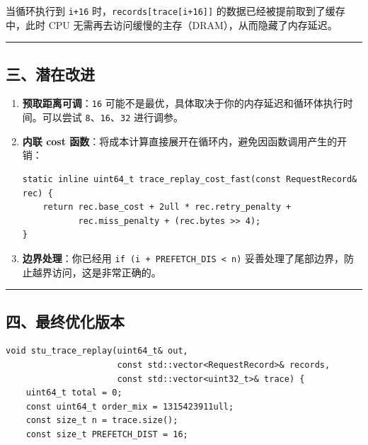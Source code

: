 \documentclass[11pt, a4paper]{article}
\begin{document}
\begin{aibox}
当循环执行到 \texttt{i+16} 时，\texttt{records[trace[i+16]]} 的数据已经被提前取到了缓存中，此时 CPU 无需再去访问缓慢的主存（DRAM），从而隐藏了内存延迟。

\begin{center}\rule{\textwidth}{0.4pt}\end{center}

\subsection*{三、潜在改进}

\begin{enumerate}
    \item \textbf{预取距离可调}：\texttt{16} 可能不是最优，具体取决于你的内存延迟和循环体执行时间。可以尝试 \texttt{8}、\texttt{16}、\texttt{32} 进行调参。
    \item \textbf{内联 cost 函数}：将成本计算直接展开在循环内，避免因函数调用产生的开销：
\begin{tcolorbox}[colback=white,colframe=gray!50!white,boxrule=0.5pt,arc=2pt,left=5pt,right=5pt,top=5pt,bottom=5pt]
\begin{verbatim}
static inline uint64_t trace_replay_cost_fast(const RequestRecord& rec) {
    return rec.base_cost + 2ull * rec.retry_penalty + 
           rec.miss_penalty + (rec.bytes >> 4);
}
\end{verbatim}
\end{tcolorbox}
    \item \textbf{边界处理}：你已经用 \texttt{if (i + PREFETCH\_DIS < n)} 妥善处理了尾部边界，防止越界访问，这是非常正确的。
\end{enumerate}

\begin{center}\rule{\textwidth}{0.4pt}\end{center}

\subsection*{四、最终优化版本}

\begin{tcolorbox}[colback=white,colframe=gray!50!white,boxrule=0.5pt,arc=2pt,left=5pt,right=5pt,top=5pt,bottom=5pt]
\begin{verbatim}
void stu_trace_replay(uint64_t& out,
                      const std::vector<RequestRecord>& records,
                      const std::vector<uint32_t>& trace) {
    uint64_t total = 0;
    const uint64_t order_mix = 1315423911ull;
    const size_t n = trace.size();
    const size_t PREFETCH_DIST = 16;
    

\end{verbatim}
\end{tcolorbox}
\end{aibox}
\end{document}
